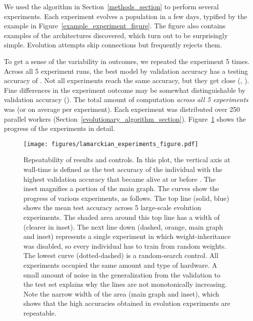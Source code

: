 \documentclass{article}
\newcommand{\meanflopsbase}{9}
\newcommand{\meanflopsexp}{19}
\newcommand{\bestacc}{94.6}
\newcommand{\totalflopsbase}{4}
\newcommand{\totalflopsexp}{20}
\begin{document}
We used the algorithm in Section~\ref{methods_section} to perform several experiments. Each experiment evolves a population in a few days, typified by the example in Figure~\ref{example_experiment_figure}. The figure also contains examples of the architectures discovered, which turn out to be surprisingly simple. Evolution attempts skip connections but frequently rejects them.

To get a sense of the variability in outcomes, we repeated the experiment 5 times. Across all 5 experiment runs, the best model by validation accuracy has a testing accuracy of \acc{\bestacc}. Not all experiments reach the same accuracy, but they get close (, ). Fine differences in the experiment outcome may be somewhat distinguishable by validation accuracy (). The total amount of computation {\em across all 5 experiments} was \flops{\totalflopsbase}{\totalflopsexp} (or \flops{\meanflopsbase}{\meanflopsexp} on average per experiment). Each experiment was distributed over 250 parallel workers (Section~\ref{evolutionary_algorithm_section}). Figure~\ref{lamarckian_experiments_figure} shows the progress of the experiments in detail.

\begin{figure}
    \vskip 0.2in
    \begin{centering}
        \centerline{\texttt{[image: figures/lamarckian\_experiments\_figure.pdf]}}
        \caption{Repeatability of results and controls. In this plot, the vertical axis at wall-time  is defined as the test accuracy of the individual with the highest validation accuracy that became alive at or before . The inset magnifies a portion of the main graph. The curves show the progress of various experiments, as follows. The top line (solid, blue) shows the mean test accuracy across 5 large-scale evolution experiments. The shaded area around this top line has a width of  (clearer in inset). The next line down (dashed, orange, main graph and inset) represents a single experiment in which weight-inheritance was disabled, so every individual has to train from random weights. The lowest curve (dotted-dashed) is a random-search control. All experiments occupied the same amount and type of hardware. A small amount of noise in the generalization from the validation to the test set explains why the lines are not monotonically increasing. Note the narrow width of the  area (main graph and inset), which shows that the high accuracies obtained in evolution experiments are repeatable.}
        \label{lamarckian_experiments_figure}
    \end{centering}
    \vskip 0.2in
\end{figure}
\end{document}
